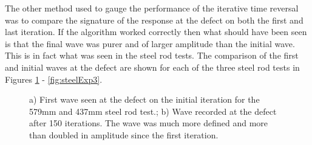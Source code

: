  
 The other method used to gauge the performance of the iterative time reversal was to compare the signature of the response at the defect on both the first and last iteration. If the algorithm worked correctly then what should have been seen is that the final wave was purer and of larger amplitude than the initial wave. This is in fact what was seen in the steel rod tests. The comparison of the first and initial waves at the defect are shown for each of the three steel rod tests in Figures \ref{fig:steelExp1} - \ref{fig:steelExp3}.
 
  \begin{figure}
 \begin{subfigmatrix}{2}
 \end{subfigmatrix}
 
    \caption[]
    { \label{fig:steelExp1}
    a) First wave seen at the defect on the initial iteration for the 579mm and 437mm steel rod test.; b) Wave recorded at the defect after 150 iterations. The wave was much more defined and more than doubled in amplitude since the first iteration.
  }
 \end{figure}
 
